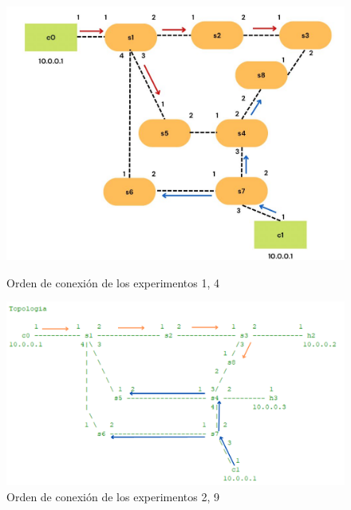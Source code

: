 \documentclass[a4paper, 12pt]{book}
\begin{document}
 	\begin{figure}[H]
 		\centering
 		\begin{minipage}[b]{0.35\textwidth}
 			\centering
 			\includegraphics[width=\textwidth]{img/escenario1_2c_1}
 			\caption{Orden de conexión de los experimentos 1, 4}
 			\label{figura:8}
 		\end{minipage}
 		\hfill
 		\begin{minipage}[b]{0.35\textwidth}
 			\centering
 			\includegraphics[width=\textwidth]{img/escenario1_2c_2}
 			\caption{Orden de conexión de los experimentos 2, 9}
 		\end{minipage}
 		
 		\vspace{10pt} %
 		

\end{figure}
\end{document}
